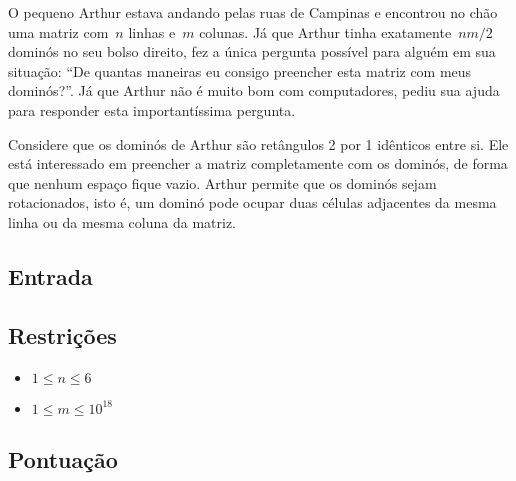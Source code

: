 O pequeno Arthur estava andando pelas ruas de Campinas e encontrou no chão uma matriz com~$n$ linhas e~$m$ colunas. Já que Arthur tinha exatamente~$nm/2$ dominós no seu bolso direito, fez a única pergunta possível para alguém em sua situação: ``De quantas maneiras eu consigo preencher esta matriz com meus dominós?''. Já que Arthur não é muito bom com computadores, pediu sua ajuda para responder esta importantíssima pergunta.

Considere que os dominós de Arthur são retângulos 2 por 1 idênticos entre si. Ele está interessado em preencher a matriz completamente com os dominós, de forma que nenhum espaço fique vazio. Arthur permite que os dominós sejam rotacionados, isto é, um dominó pode ocupar duas células adjacentes da mesma linha ou da mesma coluna da matriz.

\subsection{Entrada}


\subsection{Restrições}
\begin{itemize}
\item $1 \leq n \leq 6$
\item $1 \leq m \leq 10^{18}$
\end{itemize}

\subsection{Pontuação}
